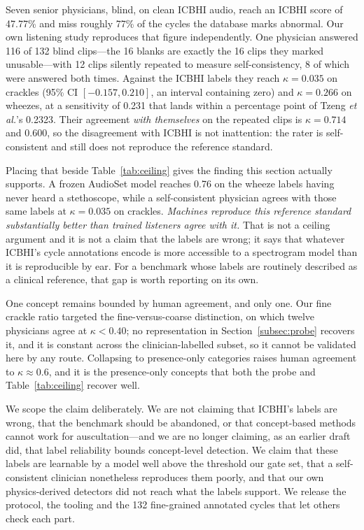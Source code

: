 \documentclass[journal,onecolumn]{IEEEtran}
\begin{document}
Seven senior physicians, blind, on clean ICBHI audio, reach an ICBHI score of 47.77\%
and miss roughly 77\% of the cycles the database marks abnormal. Our own listening
study reproduces that figure independently. One physician answered 116 of 132 blind
clips---the 16 blanks are exactly the 16 clips they marked unusable---with 12 clips
silently repeated to measure self-consistency, 8 of which were answered both times. Against the ICBHI labels they reach
$\kappa = 0.035$ on crackles (95\% CI $[-0.157, 0.210]$, an interval containing zero)
and $\kappa = 0.266$ on wheezes, at a sensitivity of 0.231 that lands within a
percentage point of Tzeng \emph{et al.}'s 0.2323. Their agreement \emph{with
themselves} on the repeated clips is $\kappa = 0.714$ and $0.600$, so the disagreement
with ICBHI is not inattention: the rater is self-consistent and still does not
reproduce the reference standard.

Placing that beside Table~\ref{tab:ceiling} gives the finding this section actually
supports. A frozen AudioSet model reaches 0.76 on the wheeze labels having never heard
a stethoscope, while a self-consistent physician agrees with those same labels at
$\kappa = 0.035$ on crackles. \emph{Machines reproduce this reference standard
substantially better than trained listeners agree with it.} That is not a ceiling
argument and it is not a claim that the labels are wrong; it says that whatever ICBHI's
cycle annotations encode is more accessible to a spectrogram model than it is
reproducible by ear. For a benchmark whose labels are routinely described as a clinical
reference, that gap is worth reporting on its own.

One concept remains bounded by human agreement, and only one. Our fine crackle ratio
targeted the fine-versus-coarse distinction, on which twelve physicians agree at
$\kappa < 0.40$; no representation in Section~\ref{subsec:probe} recovers it, and it is
constant across the clinician-labelled subset, so it cannot be validated here by any
route. Collapsing to presence-only categories raises human agreement to
$\kappa \approx 0.6$, and it is the presence-only concepts that both the probe and
Table~\ref{tab:ceiling} recover well.

We scope the claim deliberately. We are not claiming that ICBHI's labels are wrong, that
the benchmark should be abandoned, or that concept-based methods cannot work for
auscultation---and we are no longer claiming, as an earlier draft did, that label
reliability bounds concept-level detection. We claim that these labels are learnable by
a model well above the threshold our gate set, that a self-consistent clinician
nonetheless reproduces them poorly, and that our own physics-derived detectors did not
reach what the labels support. We release the protocol, the tooling and the 132
fine-grained annotated cycles that let others check each part.
\end{document}
